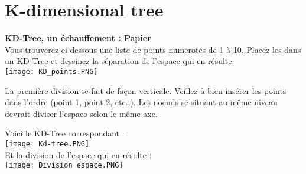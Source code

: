 \section{K-dimensional tree}

\begin{Exercice}[5 minutes]\textbf{KD-Tree, un échauffement : Papier}\\
Vous trouverez ci-dessous une liste de points numérotés de 1 à 10. Placez-les dans un KD-Tree et dessinez la séparation de l'espace qui en résulte.\\

\texttt{[image: KD\_points.PNG]}

\begin{conseil}
La première division se fait de façon verticale. Veillez à bien insérer les points dans l'ordre (point 1, point 2, etc..). Les noeuds se situant au même niveau devrait diviser l'espace selon le même axe.
\end{conseil}
\begin{solution}
    Voici le KD-Tree correspondant :\\
    \texttt{[image: Kd-tree.PNG]}\\
    Et la division de l'espace qui en résulte :\\
    \texttt{[image: Division espace.PNG]}
\end{solution}
\end{Exercice}




